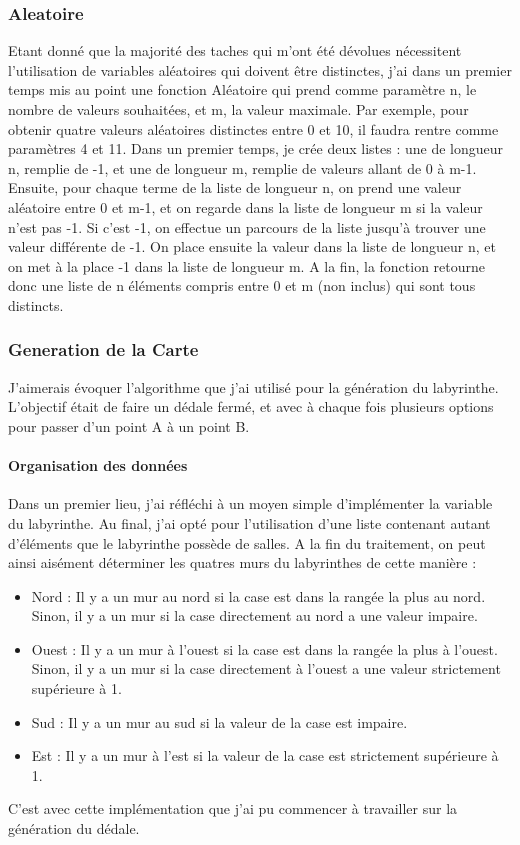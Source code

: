 \documentclass{article}
\begin{document}
\subsubsection{Aleatoire}
Etant donné que la majorité des taches qui m'ont été dévolues nécessitent l'utilisation de variables aléatoires qui doivent être distinctes, j'ai dans un premier temps mis au point une fonction Aléatoire qui prend comme paramètre n, le nombre de valeurs souhaitées, et m, la valeur maximale. Par exemple, pour obtenir quatre valeurs aléatoires distinctes entre 0 et 10, il faudra rentre comme paramètres 4 et 11. Dans un premier temps, je crée deux listes : une de longueur n, remplie de -1, et une de longueur m, remplie de valeurs allant de 0 à m-1. Ensuite, pour chaque terme de la liste de longueur n, on prend une valeur aléatoire entre 0 et m-1, et on regarde dans la liste de longueur m si la valeur n'est pas -1. Si c'est -1, on effectue un parcours de la liste jusqu'à trouver une valeur différente de -1. On place ensuite la valeur dans la liste de longueur n, et on met à la place -1 dans la liste de longueur m. A la fin, la fonction retourne donc une liste de n éléments compris entre 0 et m (non inclus) qui sont tous distincts.

\subsubsection{Generation de la Carte}
J'aimerais évoquer l'algorithme que j'ai utilisé pour la génération du labyrinthe. L'objectif était de faire un dédale fermé, et avec à chaque fois plusieurs options pour passer d'un point A à un point B.

\paragraph{Organisation des données}
Dans un premier lieu, j'ai réfléchi à un moyen simple d'implémenter la variable du labyrinthe. Au final, j'ai opté pour l'utilisation d'une liste contenant autant d'éléments que le labyrinthe possède de salles. A la fin du traitement, on peut ainsi aisément déterminer les quatres murs du labyrinthes de cette manière :
\begin{itemize}
\item Nord : Il y a un mur au nord si la case est dans la rangée la plus au nord. Sinon, il y a un mur si la case directement au nord a une valeur impaire.
\item Ouest : Il y a un mur à l'ouest si la case est dans la rangée la plus à l'ouest. Sinon, il y a un mur si la case directement à l'ouest a une valeur strictement supérieure à 1.
\item Sud : Il y a un mur au sud si la valeur de la case est impaire.
\item Est : Il y a un mur à l'est si la valeur de la case est strictement supérieure à 1.
\end{itemize}
C'est avec cette implémentation que j'ai pu commencer à travailler sur la génération du dédale.
\end{document}

